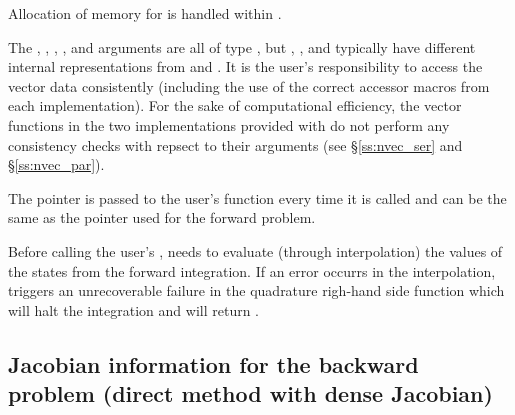 {
  Allocation of memory for  is handled within {\idas}.

  The , , , , and  arguments are all 
  of type , but , , and  typically have 
  different internal representations from  and . It is the user's 
  responsibility to access the vector data consistently (including the use of the 
  correct accessor macros from each {\nvector} implementation). For the sake of 
  computational efficiency, the vector functions in the two {\nvector} implementations 
  provided with {\idas} do not perform any consistency checks with repsect to their 
   arguments (see \S\ref{ss:nvec_ser} and \S\ref{ss:nvec_par}).

  The  pointer is passed to the user's  function every time 
  it is called and can be the same as the  pointer used for the forward problem.

  {\warn}Before calling the user's , {\idaa} needs to evaluate
  (through interpolation) the values of the states from the forward integration. 
  If an error occurrs in the interpolation, {\idaa} triggers an unrecoverable
  failure in the quadrature righ-hand side function which will halt the integration and
   will return .
}


\subsection{Jacobian information for the backward problem 
  (direct method with dense Jacobian)}
  
